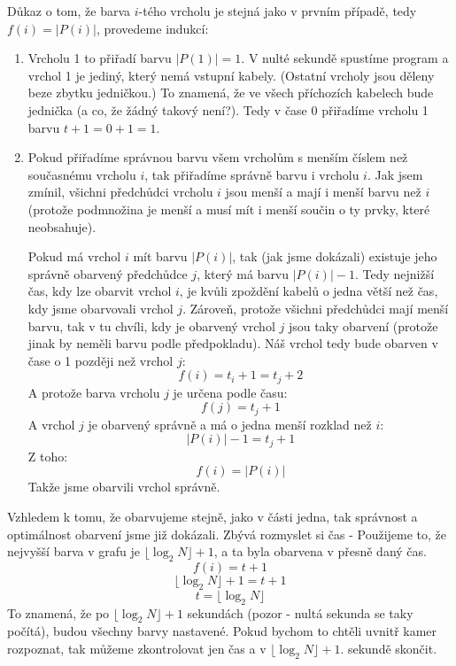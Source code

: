 \documentclass{article}
\begin{document}
Důkaz o tom, že barva \(i\)-tého vrcholu je stejná jako v prvním případě, tedy \(f(i) = |P(i)|\), provedeme indukcí:
\begin{enumerate}
    \item Vrcholu 1 to přiřadí barvu \(|P(1)| = 1\). V nulté sekundě spustíme program a vrchol 1 je jediný, který nemá vstupní kabely.
    (Ostatní vrcholy jsou děleny beze zbytku jedničkou.) To znamená, že ve všech příchozích kabelech bude jednička (a co, že žádný takový není?).
    Tedy v čase 0 přiřadíme vrcholu 1 barvu \(t + 1 = 0 + 1 = 1\).
    \item Pokud přiřadíme správnou barvu všem vrcholům s menším číslem než současnému vrcholu \(i\), tak přiřadíme správně barvu i vrcholu \(i\).
    Jak jsem zmínil, všichni předchůdci vrcholu \(i\) jsou menší a mají i menší barvu než \(i\) (protože podmnožina je menší a musí mít i menší součin
    o ty prvky, které neobsahuje). 
    
    Pokud má vrchol \(i\) mít barvu \(|P(i)|\), tak (jak jsme dokázali) existuje jeho správně obarvený předchůdce \(j\), který má barvu \(|P(i)| - 1\).
    Tedy nejnižší čas, kdy lze obarvit vrchol \(i\), je kvůli zpoždění kabelů o jedna větší než čas, kdy jsme obarvovali vrchol \(j\). Zároveň, protože
    všichni předchůdci mají menší barvu, tak v tu chvíli, kdy je obarvený vrchol \(j\) jsou taky obarvení (protože jinak by neměli barvu podle předpokladu).
    Náš vrchol tedy bude obarven v čase o 1 později než vrchol \(j\):
    \[f(i) = t_i + 1 = t_j + 2\]
    A protože barva vrcholu \(j\) je určena podle času:
    \[f(j) = t_j + 1\]
    A vrchol \(j\) je obarvený správně a má o jedna menší rozklad než \(i\):
    \[|P(i)| - 1 = t_j + 1\]
    Z toho:
    \[f(i) = |P(i)|\]
    Takže jsme obarvili vrchol správně.
\end{enumerate}

Vzhledem k tomu, že obarvujeme stejně, jako v části jedna, tak správnost a optimálnost obarvení jsme již dokázali. Zbývá rozmyslet si čas -
Použijeme to, že nejvyšší barva v grafu je \(\lfloor \log_2 N \rfloor + 1\), a ta byla obarvena v přesně daný čas.
\[f(i) = t + 1\]
\[\lfloor \log_2 N \rfloor + 1 = t + 1\]
\[t = \lfloor \log_2 N \rfloor\]
To znamená, že po \(\lfloor \log_2 N \rfloor + 1\) sekundách (pozor - nultá sekunda se taky počítá), budou všechny barvy nastavené. Pokud bychom to chtěli
uvnitř kamer rozpoznat, tak můžeme zkontrolovat jen čas a v \(\lfloor \log_2 N \rfloor + 1\). sekundě skončit.
\end{document}
